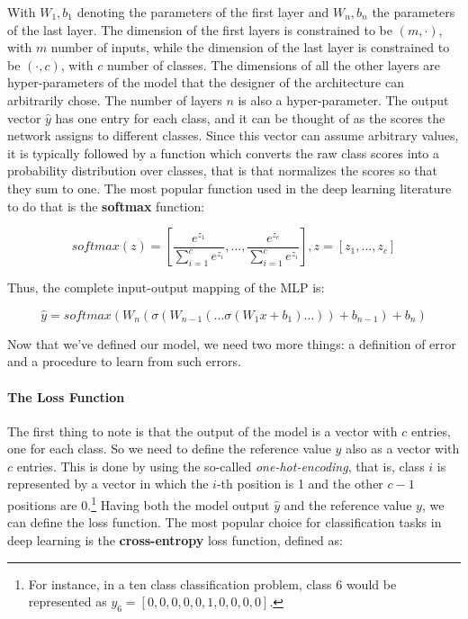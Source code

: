 \documentclass[../main.tex]{subfiles}
\begin{document}
    With $W_{1}, b_{1}$ denoting the parameters of the first layer and $W_{n}, b_{n}$ the parameters of the last layer. The dimension of the
    first layers is constrained to be $(m, \cdot)$, with $m$ number of inputs, while the dimension of the last layer is constrained to be
    $(\cdot, c)$, with $c$ number of classes. The dimensions of all the other layers are hyper-parameters of the model that the designer
    of the architecture can arbitrarily chose. The number of layers $n$ is also a hyper-parameter.
    \newline
    The output vector $\hat{y}$ has one entry for each class, and it can be thought of as the scores the network assigns to different classes.
    Since this vector can assume arbitrary values, it is typically followed by a function which converts the raw class scores into a
    probability distribution over classes, that is that normalizes the scores so that they sum to one.
    The most popular function used in the deep learning literature to do that is the \textbf{softmax} function:

    \begin{equation}
        softmax(z) = \left[ \frac{e^{z_{1}}}{\sum_{i = 1}^{c} e^{z_{i}}} , \ldots , \frac{e^{z_{c}}}{\sum_{i = 1}^{c} e^{z_{i}}} \right], z = \left[ z_{1}, \ldots ,z_{c}  \right]
    \end{equation}

    Thus, the complete input-output mapping of the MLP is:

    \begin{equation} \label{eq:MLPequation}
        \hat{y} = softmax(W_{n}(\sigma(W_{n-1}(\ldots \sigma(W_{1} x + b_{1}) \ldots)) + b_{n-1}) + b_{n})
    \end{equation}

    Now that we've defined our model, we need two more things: a definition of error and a procedure to learn from such errors.

    \paragraph{The Loss Function}
    The first thing to note is that the output of the model is a vector with $c$ entries, one for each class. So we need to define the
    reference value $y$ also as a vector with $c$ entries. This is done by using the so-called \textit{one-hot-encoding}, that is, class
    $i$ is represented by a vector in which the $i$-th position is 1 and the other $c - 1$ positions are 0.\footnote{For instance, in a ten class
    classification problem, class 6 would be represented as $y_{6} = \left[ 0, 0, 0, 0, 0, 1, 0, 0, 0, 0 \right] $.} Having both
    the model output $\hat{y}$ and the reference value $y$, we can define the loss function. The most popular choice for classification
    tasks in deep learning is the \textbf{cross-entropy} loss function, defined as:
\end{document}
